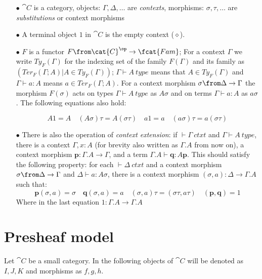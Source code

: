 \begin{itemize}
  \item[$\bullet$] $\cat{C}$ is a category, objects: $\Gamma, \Delta, \dots$ are
    \emph{contexts}, morphisms:  $\sigma, \tau, \dots$ are
    \emph{substitutions} or context morphisms

  \item[$\bullet$] A terminal object $1$ in $\cat{C}$ is the empty context ($\diamond$).

  \item[$\bullet$] $F$ is a functor $F\from \cat{C}^\op \to \fcat{Fam}$; For a
    context $\Gamma$ we write $Ty_F(\Gamma)$ for the indexing set of the family
    $F(\Gamma)$ and its family as $(Ter_F(\Gamma;A) | A \in Ty_F(\Gamma))$;
    $\Gamma \vdash A~type$ means that $A \in Ty_F(\Gamma)$ and $\Gamma \vdash a
    : A$ means $a \in Ter_F(\Gamma;A)$. For a context morphism $\sigma \from
    \Delta \to \Gamma$ the morphism $F(\sigma)$ acts on types $\Gamma \vdash
    A~type$ as $A\sigma$ and on terms $\Gamma \vdash a : A$ as $a\sigma$. The
    following equations also hold:

    \[
      A1=A \quad (A\sigma)\tau = A(\sigma\tau) \quad a1=a \quad (a\sigma)\tau=a(\sigma\tau)
    \]

  \item[$\bullet$] There is also the operation of \emph{context extension}: if
    $\vdash \Gamma~ctxt$ and $\Gamma \vdash A~type$, there is a context
    $\Gamma, x:A$ (for brevity also written as $\Gamma.A$ from now on), a
    context morphism $\mathbf{p}: \Gamma.A \to \Gamma$, and a term $\Gamma.A
    \vdash \mathbf{q} : A \mathbf{p}$. This should satisfy the following
    property: for each $\vdash \Delta~ctxt$ and a context morphism
    $\sigma \from \Delta \to \Gamma$ and $\Delta \vdash a : A \sigma$, there is
    a context morphism $(\sigma, a): \Delta \to \Gamma.A$ such that:
    \[
      \mathbf{p}(\sigma, a) = \sigma \quad \mathbf{q}(\sigma, a) = a \quad (\sigma, a) \tau =
      (\sigma \tau, a \tau) \quad (\mathbf{p}, \mathbf{q}) = 1
    \]
    Where in the last equation $1: \Gamma.A \to \Gamma.A$
\end{itemize}

\section*{Presheaf model}

Let $\cat{C}$ be a small category. In the following objects of $\cat{C}$ will
be denoted as $I,J,K$ and morphisms as $f,g,h$.


